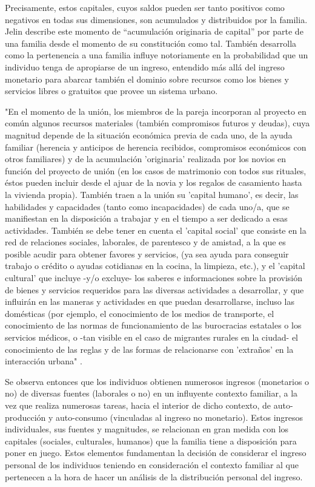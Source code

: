	Precisamente, estos capitales, cuyos saldos pueden ser tanto positivos como negativos en todas sus dimensiones, son acumulados y distribuidos por la familia. Jelin describe este momento de “acumulación originaria de capital” por parte de una familia desde el momento de su constitución como tal. También desarrolla como la pertenencia a una familia influye notoriamente en la probabilidad que un individuo tenga de apropiarse de un ingreso, entendido más allá del ingreso monetario para abarcar también el dominio sobre recursos como los bienes y servicios libres o gratuitos que provee un sistema urbano.  
	
	"En el momento de la unión, los miembros de la pareja incorporan al proyecto en común algunos recursos materiales (también compromisos futuros y deudas), cuya magnitud depende de la situación económica previa de cada uno, de la ayuda familiar (herencia y anticipos de herencia recibidos, compromisos económicos con otros familiares) y de la acumulación 'originaria' realizada por los novios en función del proyecto de unión (en los casos de matrimonio con todos sus rituales, éstos pueden incluir desde el ajuar de la novia y los regalos de casamiento hasta la vivienda propia). También traen a la unión su 'capital humano', es decir, las habilidades y capacidades (tanto como incapacidades) de cada uno/a, que se manifiestan en la disposición a trabajar y en el tiempo a ser dedicado a esas actividades. También se debe tener en cuenta el 'capital social' que consiste en la red de relaciones sociales, laborales, de parentesco y de amistad, a la que es posible acudir para obtener favores y servicios, (ya sea ayuda para conseguir trabajo o crédito o ayudas cotidianas en la cocina, la limpieza, etc.), y el 'capital cultural' que incluye -y/o excluye- los saberes e informaciones sobre la provisión de bienes y servicios requeridos para las diversas actividades a desarrollar, y que influirán en las maneras y actividades en que puedan desarrollarse, incluso las domésticas (por ejemplo, el conocimiento de los medios de transporte, el conocimiento de las normas de funcionamiento de las burocracias estatales o los servicios médicos, o -tan visible en el caso de migrantes rurales en la ciudad- el conocimiento de las reglas y de las formas de relacionarse con 'extraños' en la interacción urbana" \cite[p.~96]{jelin}.
	
	Se observa entonces que los individuos obtienen numerosos ingresos (monetarios o no) de diversas fuentes (laborales o no) en un influyente contexto familiar, a la vez que realiza numerosas tareas, hacia el interior de dicho contexto, de auto-producción y auto-consumo (vinculadas al ingreso no monetario). Estos ingresos individuales, sus fuentes y magnitudes, se relacionan en gran medida con los capitales (sociales, culturales, humanos) que la familia tiene a disposición para poner en juego. Estos elementos fundamentan la decisión de considerar el ingreso personal de los individuos teniendo en consideración el contexto familiar al que pertenecen a la hora de hacer un análisis de la distribución personal del ingreso.
	
